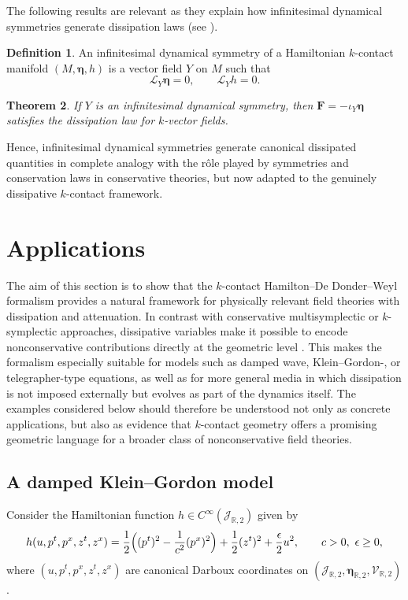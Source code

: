 \documentclass[11pt,a4paper]{article}
\theoremstyle{plain} \newtheorem{theorem}{Theorem}[section] \newtheorem{proposition}[theorem]{Proposition} \newtheorem{corollary}[theorem]{Corollary} \newtheorem{lemma}[theorem]{Lemma} \theoremstyle{definition} \newtheorem{definition}[theorem]{Definition} \theoremstyle{remark} \newtheorem{remark}[theorem]{Remark} \newtheorem{example}[theorem]{Example} %
\begin{document}
The following results are relevant as they explain how infinitesimal dynamical symmetries generate dissipation laws (see \cite[Proposition 6.6 \& Proposition 6.10]{GGMRR_20}). 

\begin{definition} An infinitesimal dynamical symmetry of a Hamiltonian $k$-contact manifold $(M,\bm\eta,h)$ is a vector field $Y$ on $M$ such that
$$
\mathcal{L}_Y\bm\eta=0,\qquad \mathcal{L}_Yh=0.
$$
\end{definition}

\begin{theorem} If $Y$ is an infinitesimal dynamical symmetry, then
\(
{\bm F}=-\iota_Y{\bm \eta}
\) 
satisfies the dissipation law for $k$-vector fields.
\end{theorem}

Hence, infinitesimal dynamical symmetries generate canonical dissipated quantities in complete analogy with the rôle played by symmetries and conservation laws in conservative theories, but now adapted to the genuinely dissipative $k$-contact framework.

\section{Applications}
\label{sec:examples}

The aim of this section is to show that the $k$-contact Hamilton--De Donder--Weyl formalism provides a natural framework for physically relevant field theories with dissipation and attenuation. In contrast with conservative multisymplectic or $k$-symplectic approaches, dissipative variables make it possible to encode nonconservative contributions directly at the geometric level \cite{GGMRR_20,Riv_22}. This makes the formalism especially suitable for models such as damped wave, Klein--Gordon-, or telegrapher-type equations, as well as for more general media in which dissipation is not imposed externally but evolves as part of the dynamics itself. The examples considered below should therefore be understood not only as concrete applications, but also as evidence that $k$-contact geometry offers a promising geometric language for a broader class of nonconservative field theories.
\subsection{A damped Klein--Gordon model}
\label{subsec:dampedwave}
Consider the Hamiltonian function
\(
h\in C^\infty(\mathcal{J}_{\mathbb{R},2})
\)
given by
\[
h(u,p^{t},p^{x},z^{t},z^{x})
=
\frac12\Bigl((p^{t})^{2}-\frac{1}{c^{2}}(p^{x})^{2}\Bigr)
+\frac12(z^{t})^{2}
+\frac{\epsilon}{2}u^{2},
\qquad c>0,\ \epsilon\geq 0,
\]
where \((u,p^{t},p^{x},z^{t},z^{x})\) are canonical Darboux coordinates on \((\mathcal{J}_{\mathbb{R},2},\bm\eta_{\mathbb{R},2},\mathcal{V}_{\mathbb{R},2})\).
\end{document}
